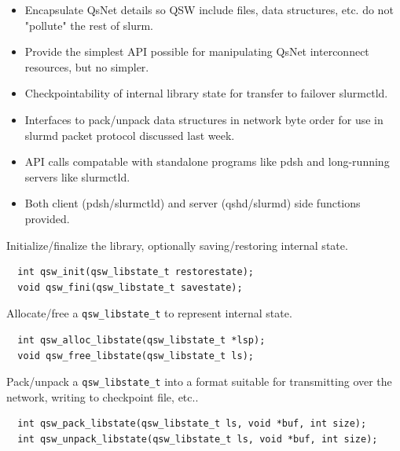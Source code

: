 \documentclass[letter,landscape]{seminar}
\begin{document}


\begin{slide}
\begin{center}
\end{center}
\end{slide}

\begin{slide}
  \small
  \begin{itemize}
  \item Encapsulate QsNet details so QSW include files, data structures, etc.
        do not "pollute" the rest of slurm.
  \item Provide the simplest API possible for manipulating QsNet interconnect
        resources, but no simpler.
  \item Checkpointability of internal library state for transfer to failover
        slurmctld.
  \item Interfaces to pack/unpack data structures in network byte order for
        use in slurmd packet protocol discussed last week.
  \item API calls compatable with standalone programs like pdsh and
        long-running servers like slurmctld.
  \item Both client (pdsh/slurmctld) and server (qshd/slurmd) side functions
        provided.
  \end{itemize}
\end{slide}

\begin{slide}
  \small
  Initialize/finalize the library, optionally saving/restoring internal state.
  \begin{verbatim}
  int qsw_init(qsw_libstate_t restorestate);
  void qsw_fini(qsw_libstate_t savestate);
  \end{verbatim}
  Allocate/free a {\tt qsw\_libstate\_t} to represent internal state.
  \begin{verbatim}
  int qsw_alloc_libstate(qsw_libstate_t *lsp);
  void qsw_free_libstate(qsw_libstate_t ls);
  \end{verbatim}
  Pack/unpack a {\tt qsw\_libstate\_t} into a format suitable for transmitting
  over the network, writing to checkpoint file, etc..
  \begin{verbatim}
  int qsw_pack_libstate(qsw_libstate_t ls, void *buf, int size);
  int qsw_unpack_libstate(qsw_libstate_t ls, void *buf, int size);
  \end{verbatim}
\end{slide}
\end{document}
